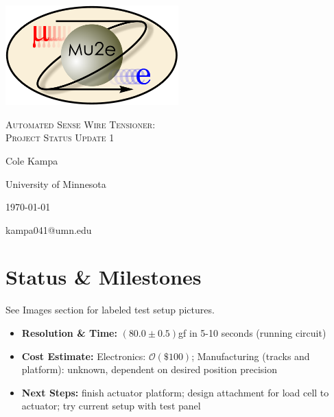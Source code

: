 \documentclass[letterpaper,12pt]{article}
\begin{document}
\begin{titlepage}
	\centering
	\includegraphics[width=0.5\textwidth]{mu2e_logo_oval.png}\par\vspace{2cm}
	{\scshape\LARGE Automated Sense Wire Tensioner: \\ Project Status Update 1\par}
	\vspace{3cm}
	{\Large Cole Kampa\par}
	\vspace{3.5cm}
	{\large University of Minnesota\par}
 	\vspace{.5cm}
	{\large \today \par}
	\vfill
	{kampa041@umn.edu\par}
\end{titlepage}

\clearpage
\setcounter{page}{2}


\section*{Status \& Milestones}
See Images section for labeled test setup pictures.
\begin{itemize}
\item{\textbf{Resolution \& Time:} $(80.0\pm 0.5)$gf in 5-10 seconds (running circuit)
}
\item{\textbf{Cost Estimate:} Electronics: $\mathcal{O}(\$100)$; Manufacturing (tracks and platform): unknown, dependent on desired position precision
}
\item{\textbf{Next Steps:} finish actuator platform; design attachment for load cell to actuator; try current setup with test panel
}
\end{itemize}
\end{document}
